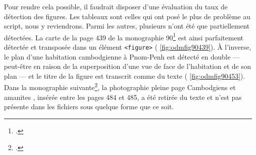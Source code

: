 Pour rendre cela possible, il faudrait disposer d'une évaluation du taux de détection des figures. Les tableaux sont celles qui ont posé le plus de problème au script, nous y reviendrons. Parmi les autres, plusieurs n'ont été que partiellement détectées. La carte de la page 439 de la monographie 90\footcite{mono090a} est ainsi parfaitement détectée et transposée dans un élément \texttt{<figure>} (\fig{} \ref{fig:odmfig90439}). À l'inverse, le plan d'une \og habitation cambodgienne à Pnom-Penh \fg{} est détecté en double --- peut-être en raison de la superposition d'une vue de face de l'habitation et de son plan --- et le titre de la figure est transcrit comme du texte (\fig{} \ref{fig:odmfig90453}). Dans la monographie suivante\footcite{mono090b}, la photographie pleine page \og Cambodgiens et amanites \fg{}, insérée entre les pages 484 et 485, a été retirée du texte et n'est pas présente dans les fichiers sous quelque forme que ce soit.

